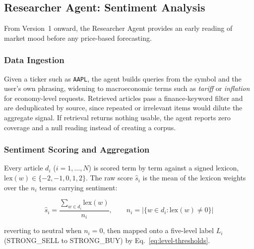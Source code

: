 \documentclass[conference]{IEEEtran}
\begin{document}
\subsection{Researcher Agent: Sentiment Analysis}

From Version~1 onward, the Researcher Agent provides an early reading of market mood before any price-based forecasting.

\subsubsection{Data Ingestion}

Given a ticker such as \texttt{AAPL}, the agent builds queries from the symbol and the user's own phrasing, widening to macroeconomic terms such as \emph{tariff} or \emph{inflation} for economy-level requests. Retrieved articles pass a finance-keyword filter and are deduplicated by source, since repeated or irrelevant items would dilute the aggregate signal. If retrieval returns nothing usable, the agent reports zero coverage and a null reading instead of creating a corpus.

\subsubsection{Sentiment Scoring and Aggregation}

Every article $d_i$ ($i=1,\dots,N$) is scored term by term against a signed lexicon, $\mathrm{lex}(w)\in\{-2,-1,0,1,2\}$. The raw score $\hat{s}_i$ is the mean of the lexicon weights over the $n_i$ terms carrying sentiment:

\begin{equation}
\hat{s}_i = \frac{\sum_{w \in d_i}\mathrm{lex}(w)}{n_i}, \qquad n_i = \bigl|\{w \in d_i : \mathrm{lex}(w)\neq 0\}\bigr|
\end{equation}

reverting to neutral when $n_i=0$, then mapped onto a five-level label $L_i$ (STRONG\_SELL to STRONG\_BUY) by Eq.~\eqref{eq:level-thresholds}.
\end{document}
